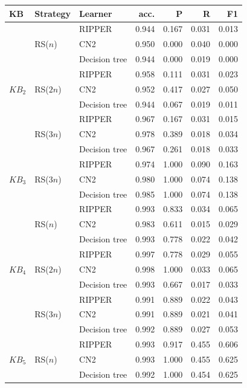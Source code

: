 \begin{tabular}{lllrrrr}
\toprule
KB & Strategy & Learner & acc. & P & R & F1 \\
\midrule
\multirow{9}{*}{$KB_2$} & \multirow{3}{*}{RS($n$)} & RIPPER & 0.944 & 0.167 & 0.031 & 0.013 \\
 &  & CN2 & 0.950 & 0.000 & 0.040 & 0.000 \\
 &  & Decision tree & 0.944 & 0.000 & 0.019 & 0.000 \\
\cmidrule(l){2-7}
 & \multirow{3}{*}{RS($2n$)} & RIPPER & 0.958 & 0.111 & 0.031 & 0.023 \\
 &  & CN2 & 0.952 & 0.417 & 0.027 & 0.050 \\
 &  & Decision tree & 0.944 & 0.067 & 0.019 & 0.011 \\
\cmidrule(l){2-7}
 & \multirow{3}{*}{RS($3n$)} & RIPPER & 0.967 & 0.167 & 0.031 & 0.015 \\
 &  & CN2 & 0.978 & 0.389 & 0.018 & 0.034 \\
 &  & Decision tree & 0.967 & 0.261 & 0.018 & 0.033 \\
\midrule
\multirow{3}{*}{$KB_3$} & \multirow{3}{*}{RS($3n$)} & RIPPER & 0.974 & 1.000 & 0.090 & 0.163 \\
 &  & CN2 & 0.980 & 1.000 & 0.074 & 0.138 \\
 &  & Decision tree & 0.985 & 1.000 & 0.074 & 0.138 \\
\midrule
\multirow{9}{*}{$KB_4$} & \multirow{3}{*}{RS($n$)} & RIPPER & 0.993 & 0.833 & 0.034 & 0.065 \\
 &  & CN2 & 0.983 & 0.611 & 0.015 & 0.029 \\
 &  & Decision tree & 0.993 & 0.778 & 0.022 & 0.042 \\
\cmidrule(l){2-7}
 & \multirow{3}{*}{RS($2n$)} & RIPPER & 0.997 & 0.778 & 0.029 & 0.055 \\
 &  & CN2 & 0.998 & 1.000 & 0.033 & 0.065 \\
 &  & Decision tree & 0.993 & 0.667 & 0.017 & 0.033 \\
\cmidrule(l){2-7}
 & \multirow{3}{*}{RS($3n$)} & RIPPER & 0.991 & 0.889 & 0.022 & 0.043 \\
 &  & CN2 & 0.991 & 0.889 & 0.021 & 0.041 \\
 &  & Decision tree & 0.992 & 0.889 & 0.027 & 0.053 \\
\midrule
\multirow{3}{*}{$KB_5$} & \multirow{3}{*}{RS($n$)} & RIPPER & 0.993 & 0.917 & 0.455 & 0.606 \\
 &  & CN2 & 0.993 & 1.000 & 0.455 & 0.625 \\
 &  & Decision tree & 0.992 & 1.000 & 0.454 & 0.625 \\
\bottomrule
\end{tabular}

